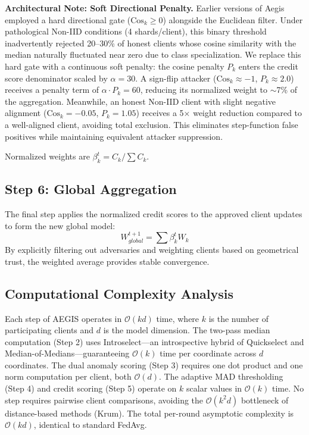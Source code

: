 \documentclass[10pt, conference]{IEEEtran}
\begin{document}
\textbf{Architectural Note: Soft Directional Penalty.}
Earlier versions of Aegis employed a hard directional gate ($\text{Cos}_k \geq 0$) alongside the Euclidean filter. Under pathological Non-IID conditions (4 shards/client), this binary threshold inadvertently rejected 20--30\% of honest clients whose cosine similarity with the median naturally fluctuated near zero due to class specialization. We replace this hard gate with a continuous soft penalty: the cosine penalty $P_k$ enters the credit score denominator scaled by $\alpha = 30$. A sign-flip attacker ($\text{Cos}_k \approx -1$, $P_k \approx 2.0$) receives a penalty term of $\alpha \cdot P_k = 60$, reducing its normalized weight to $\sim$7\% of the aggregation. Meanwhile, an honest Non-IID client with slight negative alignment ($\text{Cos}_k = -0.05$, $P_k = 1.05$) receives a 5$\times$ weight reduction compared to a well-aligned client, avoiding total exclusion. This eliminates step-function false positives while maintaining equivalent attacker suppression.

Normalized weights are $\beta_k^t = C_k / \sum C_k$.

\subsection{Step 6: Global Aggregation}
The final step applies the normalized credit scores to the approved client updates to form the new global model:
\begin{equation}
W_{global}^{t+1} = \sum \beta_k^t W_k
\end{equation}
By explicitly filtering out adversaries and weighting clients based on geometrical trust, the weighted average provides stable convergence.

\subsection{Computational Complexity Analysis}
Each step of AEGIS operates in $\mathcal{O}(kd)$ time, where $k$ is the number of participating clients and $d$ is the model dimension. The two-pass median computation (Step 2) uses Introselect---an introspective hybrid of Quickselect and Median-of-Medians---guaranteeing $\mathcal{O}(k)$ time per coordinate across $d$ coordinates. The dual anomaly scoring (Step 3) requires one dot product and one norm computation per client, both $\mathcal{O}(d)$. The adaptive MAD thresholding (Step 4) and credit scoring (Step 5) operate on $k$ scalar values in $\mathcal{O}(k)$ time. No step requires pairwise client comparisons, avoiding the $\mathcal{O}(k^2 d)$ bottleneck of distance-based methods (Krum). The total per-round asymptotic complexity is $\mathcal{O}(kd)$, identical to standard FedAvg.
\end{document}

